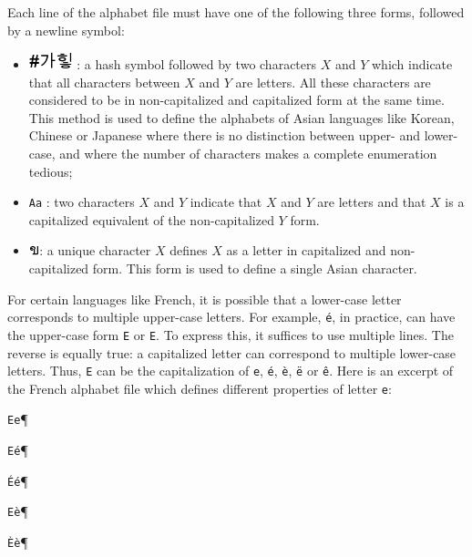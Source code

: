 \bigskip
\noindent Each line of the alphabet file must have one of the following
three forms, followed by a newline symbol:

\begin{itemize}
  \item \includegraphics[height=0.5cm]{resources/img/korean_letters.png} : a
  hash symbol followed by two characters $X$ and $Y$ which indicate that all characters between $X$ and $Y$
  are letters. All these characters are considered to be in non-capitalized and
  capitalized form at the same time. This method is used to define the alphabets
  of Asian languages like Korean, Chinese or Japanese where there is no
  distinction between upper- and lower-case, and where the number of characters
  makes a complete enumeration tedious;

  \item \verb+Aa+ : two characters $X$ and $Y$ indicate that $X$ and $Y$ are
  letters and that $X$ is a capitalized equivalent of the non-capitalized $Y$
  form.

  \item \includegraphics[height=0.3cm]{resources/img/thai_letter.png}: a unique
  character $X$ defines $X$ as a letter in capitalized and non-capitalized form. This form is used to define a
  single Asian character.
\end{itemize}

\bigskip
\noindent For certain languages like French, it is possible that a lower-case
letter corresponds to multiple upper-case letters. For example, \texttt{\'e}, in
practice, can have the upper-case form \verb+E+ or \texttt{E}. To express
this, it suffices to use multiple lines. The reverse is equally true: a capitalized letter
can correspond to multiple lower-case letters. Thus, \verb+E+ can be the
capitalization of \verb+e+, \texttt{\'e}, \texttt{\`e}, \texttt{\"e} or
\texttt{\^e}. Here is an excerpt of the French alphabet file which defines different properties of letter
\verb+e+:

\bigskip
\noindent
\texttt{Ee}\P

\noindent
\texttt{E\'e}\P

\noindent
\texttt{\'E\'e}\P

\noindent
\texttt{E\`e}\P

\noindent
\texttt{\`E\`e}\P


